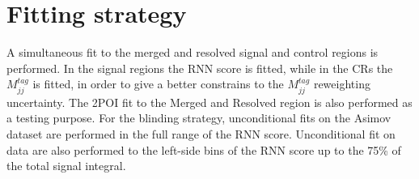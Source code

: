 \section{Fitting strategy}
A simultaneous fit to the merged and resolved signal and control regions is performed. In the signal regions the RNN score is fitted, while in the CRs the $M^{tag}_{jj}$ is fitted, in order to give a better constrains to the $M^{tag}_{jj}$ reweighting uncertainty. The 2POI fit to the Merged and Resolved region is also performed as a testing purpose. For the blinding strategy, unconditional fits on the Asimov dataset are performed in the full range of the RNN score. Unconditional fit on data are also performed to the left-side bins of the RNN score up to the 75\% of the total signal integral.



